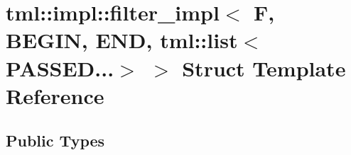 \hypertarget{structtml_1_1impl_1_1filter__impl_3_01F_00_01BEGIN_00_01END_00_01tml_1_1list_3_01PASSED_8_8_8_4_01_4}{\section{tml\+:\+:impl\+:\+:filter\+\_\+impl$<$ F, B\+E\+G\+I\+N, E\+N\+D, tml\+:\+:list$<$ P\+A\+S\+S\+E\+D...$>$ $>$ Struct Template Reference}
\label{structtml_1_1impl_1_1filter__impl_3_01F_00_01BEGIN_00_01END_00_01tml_1_1list_3_01PASSED_8_8_8_4_01_4}
}
\subsection*{Public Types}
